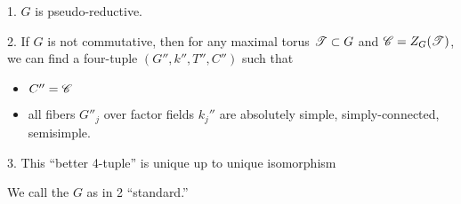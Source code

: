 \begin{theo}
1. $G$ is pseudo-reductive. 

2. If $G$ is not commutative, then for any maximal torus $\mathscr{T}\subset G$ and 
$\mathscr{C}=Z_G(\mathscr{T})$, we can find a four-tuple $(G'',k'',T'',C'')$ such that 
\begin{itemize}
  \item $C''=\mathscr{C}$
  \item all fibers $G''_j$ over factor fields $k_j''$ are absolutely simple, simply-connected, semisimple. 
\end{itemize}
3. This ``better 4-tuple'' is unique up to unique isomorphism 
\end{theo}
We call the $G$ as in 2 ``standard.'' 





